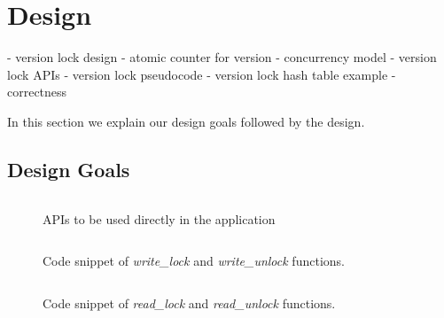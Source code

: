 \section{Design}
\label{s:des}

- version lock design 
	- atomic counter for version
	- concurrency model
	- version lock APIs
- version lock pseudocode
- version lock hash table example
- correctness

In this section we explain our design goals followed by the \sys design.

\subsection{Design Goals}
\label{s:des:goals}





\begin{figure}[t]
 \centering
 \begin{subfloat}
 \centering
 \inputminted[xleftmargin=11pt,fontsize=\scriptsize,escapeinside=@@]{c}{code/api.c}
 \end{subfloat}
 \coderule
	\caption{\sys APIs to be used directly in the application}
 \label{f:vlw}
\end{figure}

\begin{figure}[t]
 \centering
 \begin{subfloat}
 \centering
 \inputminted[xleftmargin=11pt,fontsize=\scriptsize,escapeinside=@@]{c}{code/vlw.c}
 \end{subfloat}
 \coderule
	\caption{Code snippet of \sys \emph{write\_lock} and \emph{write\_unlock} 
	functions. }
 \label{f:vlw}
\end{figure}

\begin{figure}[t]
 \centering
 \begin{subfloat}
 \centering
 \inputminted[xleftmargin=11pt,fontsize=\scriptsize,escapeinside=@@]{c}{code/vlr.c}
 \end{subfloat}
 \coderule
	\caption{Code snippet of \sys \emph{read\_lock} and \emph{read\_unlock} 
	functions. }
 \label{f:vlr}
\end{figure}


